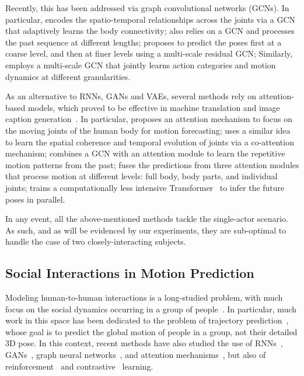 Recently, this has been addressed via graph convolutional networks (GCNs). In particular, \cite{Mao19} encodes the spatio-temporal relationships across the joints via a GCN that adaptively learns the body connectivity; \cite{Lebailly20} also relies on a GCN and processes the past sequence at different lengths; \cite{Lingwei21} proposes to predict the poses first at a coarse level, and then at finer levels using a multi-scale residual GCN; Similarly,~\cite{Li21b} employs a multi-scale GCN that jointly learns action categories and motion dynamics at different granularities.

As an alternative to RNNs, GANs and VAEs, several methods rely on attention-based models, which proved to be effective in machine translation and image caption generation~\cite{Bahdanau15, Xu15, Vaswani17}. In particular, \cite{Tang18c} proposes an attention mechanism to focus on the moving joints of the human body for motion forecasting; \cite{Shu20} uses a similar idea to learn the spatial coherence and temporal evolution of joints via a co-attention mechanism; \cite{Mao20} combines a GCN with an attention module to learn the repetitive motion patterns from the past;  \cite{Mao21a} fuses the predictions from three attention modules that process motion at different levels: full body, body parts, and individual joints; \cite{Gonzalez21} trains a computationally less intensive Transformer~\cite{Vaswani17} to infer the future poses in parallel.

In any event, all the above-mentioned methods tackle the single-actor scenario. As such, and as will be evidenced by our experiments, they are sub-optimal to handle the case of two closely-interacting subjects.

\subsection{Social Interactions in Motion Prediction}
Modeling human-to-human interactions is a long-studied problem, with much focus on the social dynamics occurring in a group of people~\cite{Helbing95}. In particular, much work in this space has been dedicated to the problem of trajectory prediction~\cite{Alahi14,Mehran09,Pellegrini09,Yamaguchi11,Robicquet16}, whose goal is to predict the global motion of people in a group, not their detailed 3D pose. In this context, recent methods have also studied the use of RNNs~\cite{Alahi16,Santaro17a,Deo18,Sun18c,Sun19c}, GANs~\cite{Gupta18,Sadeghian19,Kosaraju19}, graph neural networks~\cite{Huang19b,Casas20,Zhang21}, and attention mechanisms~\cite{Li21c,Li21d,Liu21c,Shafiee21}, but also of reinforcement~\cite{Lee17a} and contrastive~\cite{Liu21d} learning.

